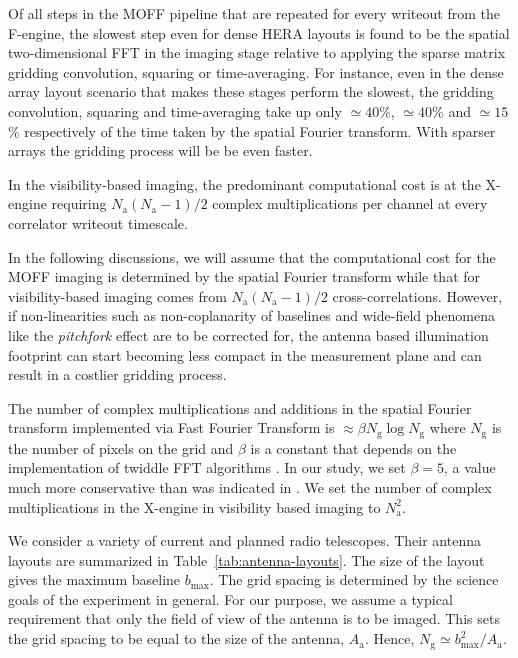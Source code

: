 \documentclass[a4paper,fleqn,usenatbib]{../mnras}
\begin{document}
Of all steps in the MOFF pipeline that are repeated for every writeout from 
the F-engine, the slowest step even for dense HERA layouts is found to be the 
spatial two-dimensional FFT in the imaging stage relative to applying the sparse 
matrix gridding convolution, squaring or time-averaging. For instance, even in 
the dense array layout scenario that makes these stages perform the slowest, the 
gridding convolution, squaring and time-averaging take up only $\simeq 40$\%, 
$\simeq 40$\% and $\simeq 15$\% respectively of the time taken by the spatial 
Fourier transform. With sparser arrays the gridding process will be be even 
faster. 

In the visibility-based imaging, the predominant computational cost is at
the X-engine requiring $N_\textrm{a}(N_\textrm{a}-1)/2$ complex multiplications 
per channel at every correlator writeout timescale. 

In the following discussions, we will assume that the computational cost for
the MOFF imaging is determined by the spatial Fourier transform while  
that for visibility-based imaging comes from $N_\textrm{a}(N_\textrm{a}-1)/2$ 
cross-correlations. However, if non-linearities such as non-coplanarity of 
baselines \citep{cor08} and wide-field phenomena like the {\it pitchfork} 
effect \citep{thy15a,thy15b} are to be corrected for, the antenna based 
illumination footprint can start becoming less compact in the measurement 
plane and can result in a costlier gridding process.

The number of complex multiplications and additions in the spatial Fourier 
transform implemented via Fast Fourier Transform \citep[FFT;][]{coo65} is 
$\approx \beta N_\textrm{g}\log N_\textrm{g}$ where $N_\textrm{g}$ 
is the number of pixels on the grid and $\beta$ is a constant that depends on 
the implementation of twiddle FFT algorithms \citep{bri74}. In our study, we 
set $\beta=5$, a value much more conservative than was indicated in 
\citet{mor11}. We set the number of complex multiplications in the X-engine 
in visibility based imaging to $N_\textrm{a}^2$.

We consider a variety of current and planned radio telescopes. Their antenna 
layouts are summarized in Table~\ref{tab:antenna-layouts}. The size of the 
layout gives the maximum baseline $b_\textrm{max}$. The grid spacing is 
determined by the science goals of the experiment in general. For our 
purpose, we assume a typical requirement that only the field of view of the 
antenna is to be imaged. This sets the grid spacing to be equal to the size 
of the antenna, $A_\textrm{a}$. Hence, 
$N_\textrm{g}\simeq b_\textrm{max}^2/A_\textrm{a}$. 
\end{document}
